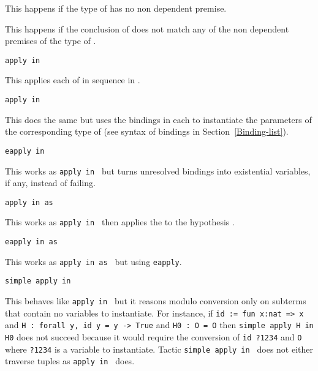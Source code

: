 \begin{coq_example*}
\begin{ErrMsgs}
This happens if the type of {\term} has no non dependent premise.

\item {}

This happens if the conclusion of {\ident} does not match any of the
non dependent premises of the type of {\term}.
\end{ErrMsgs}

\begin{Variants}
\item {\tt apply \nelist{\term}{,} in {\ident}}

This applies each of {\term} in sequence in {\ident}.

\item {\tt apply  in {\ident}}

This does the same but uses the bindings in each {\bindinglist} to
instantiate the parameters of the corresponding type of {\term}
(see syntax of bindings in Section~\ref{Binding-list}).

\item {\tt eapply  in {\ident}}

This works as {\tt apply  in
{\ident}} but turns unresolved bindings into existential variables, if
any, instead of failing.

\item {\tt apply  in {\ident} as {\intropattern}}

This works as {\tt apply  in
{\ident}} then applies the {\intropattern} to the hypothesis {\ident}.

\item {\tt eapply  in {\ident} as {\intropattern}}

This works as {\tt apply  in {\ident} as {\intropattern}} but using {\tt eapply}.

\item {\tt simple apply {\term} in {\ident}}

This behaves like {\tt apply {\term} in {\ident}} but it reasons
modulo conversion only on subterms that contain no variables to
instantiate. For instance, if {\tt id := fun x:nat => x} and {\tt H :
  forall y, id y = y -> True} and {\tt H0 :\ O = O} then {\tt simple
  apply H in H0} does not succeed because it would require the
conversion of {\tt id ?1234} and {\tt O} where {\tt ?1234} is a variable to
instantiate.  Tactic {\tt simple apply {\term} in {\ident}} does not
either traverse tuples as {\tt apply {\term} in {\ident}} does.


\end{Variants}
\end{coq_example*}
